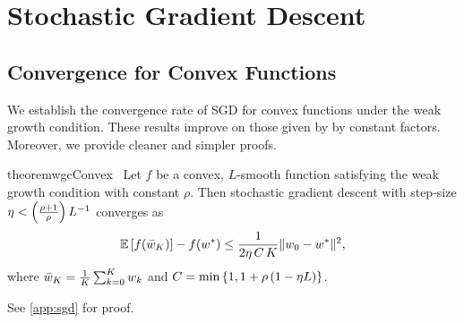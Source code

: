 
\chapter{Stochastic Gradient Descent}\label{ch:sgd}

\section{Convergence for Convex Functions}

We establish the convergence rate of SGD for convex functions under the weak growth condition. These results improve on those given by \citet{vaswani2019fast} by constant factors. 
Moreover, we provide cleaner and simpler proofs.
\begin{restatable}{theorem}{wgcConvex}~\label{thm:wgc-convex}
    Let \( f  \) be a convex, \( L  \)-smooth function satisfying the weak growth condition with constant \( \rho  \). 
    Then stochastic gradient descent with step-size \( \eta < \left(\frac{\rho + 1}{\rho}\right)L^{-1} \) converges as
    \[ \mathbb{E}\left[f(\bar w_K)\right] - f(w^*) \leq \frac{1}{2\eta \, C \, K} \|w_0 - w^*\|^2,   \]
    where \( \bar {w}_K = \frac{1}{K} \sum_{k=0}^K w_k \) and \( C = \min\left\{1,1+\rho \left(1 - \eta L\right)\right\} \). 
\end{restatable}
See \autoref{app:sgd} for proof.

\endinput
